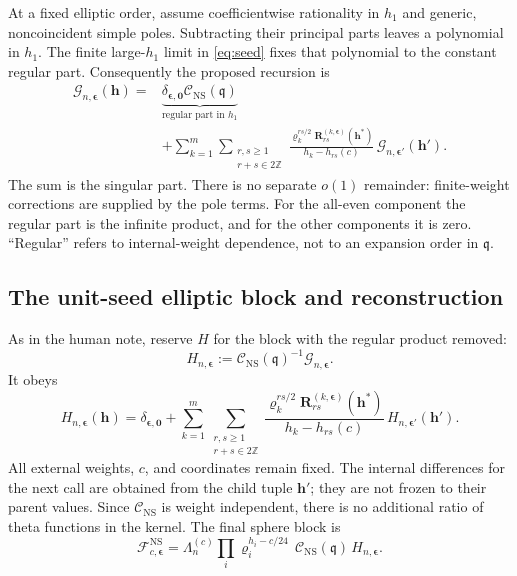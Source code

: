 \documentclass[11pt]{article}
\numberwithin{equation}{section}
\newcommand{\NS}{\mathrm{NS}}
\newcommand{\fq}{\mathfrak q}
\newcommand{\cF}{\mathcal F}
\newcommand{\cG}{\mathcal G}
\newcommand{\cC}{\mathcal C}
\newcommand{\ve}{\boldsymbol\epsilon}
\newcommand{\vh}{\boldsymbol h}
\begin{document}
At a fixed elliptic order, assume coefficientwise rationality in $h_1$
and generic, noncoincident simple poles. Subtracting their principal
parts leaves a polynomial in $h_1$. The finite large-$h_1$ limit in
\eqref{eq:seed} fixes that polynomial to the constant regular part.
Consequently the proposed recursion is
\begin{equation}
 \boxed{\begin{aligned}
 \cG_{n,\ve}(\vh)
 ={}&\underbrace{\delta_{\ve,\boldsymbol0}\cC_{\NS}(\fq)}
                         _{\text{regular part in }h_1}\\
 &+\sum_{k=1}^m\sum_{\substack{r,s\geq1\\r+s\in2\mathbb Z}}
 \frac{\varrho_k^{rs/2}\mathbf R^{(k,\ve)}_{rs}(\vh^*)}
      {h_k-h_{rs}(c)}\,
 \cG_{n,\ve'}(\vh').
 \end{aligned}}
 \label{eq:G-recursion}
\end{equation}
The sum is the singular part. There is no separate $o(1)$ remainder:
finite-weight corrections are supplied by the pole terms. For the
all-even component the regular part is the infinite product, and for
the other components it is zero. ``Regular'' refers to internal-weight
dependence, not to an expansion order in $\fq$.

\subsection{The unit-seed elliptic block and reconstruction}

As in the human note, reserve $H$ for the block with the regular product
removed:
\begin{equation}
 H_{n,\ve}:=\cC_{\NS}(\fq)^{-1}\cG_{n,\ve}.
 \label{eq:unit-H}
\end{equation}
It obeys
\begin{equation}
 \boxed{\quad
 H_{n,\ve}(\vh)=\delta_{\ve,\boldsymbol0}
 +\sum_{k=1}^m\sum_{\substack{r,s\geq1\\r+s\in2\mathbb Z}}
 \frac{\varrho_k^{rs/2}\mathbf R^{(k,\ve)}_{rs}(\vh^*)}
      {h_k-h_{rs}(c)}\,
 H_{n,\ve'}(\vh').
 \quad}
 \label{eq:H-recursion}
\end{equation}
All external weights, $c$, and coordinates remain fixed. The internal
differences for the next call are obtained from the child tuple
$\vh'$; they are not frozen to their parent values. Since
$\cC_{\NS}$ is weight independent, there is no additional ratio of
theta functions in the kernel. The final sphere block is
\begin{equation}
 \boxed{\quad
 \cF^{\NS}_{c,\ve}
 =\Lambda_n^{(c)}
   \prod_i\varrho_i^{h_i-c/24}\,
   \cC_{\NS}(\fq)\,H_{n,\ve}.
 \quad}
 \label{eq:reconstruction}
\end{equation}
\end{document}
